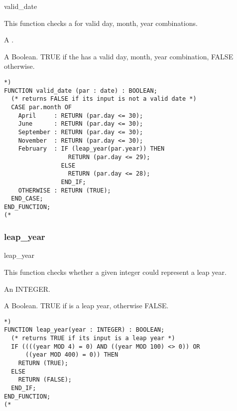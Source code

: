 \documentclass{article}
\begin{document}
\begin{Mnamedesc}{valid_date}
\begin{Mdesctext}
This function checks a  for valid day, month, year combinations.
\end{Mdesctext}

\begin{Ipars}

\item[par:] A .

\item[RESULT:] A Boolean. TRUE if the  has a valid day, month, year
combination, FALSE otherwise.
\end{Ipars}

\begin{Mexp}
\begin{verbatim}
*)
FUNCTION valid_date (par : date) : BOOLEAN;
  (* returns FALSE if its input is not a valid date *)
  CASE par.month OF
    April     : RETURN (par.day <= 30);
    June      : RETURN (par.day <= 30);
    September : RETURN (par.day <= 30);
    November  : RETURN (par.day <= 30);
    February  : IF (leap_year(par.year)) THEN
                  RETURN (par.day <= 29);
                ELSE
                  RETURN (par.day <= 28);
                END_IF;
    OTHERWISE : RETURN (TRUE);
  END_CASE;
END_FUNCTION;
(*
\end{verbatim}
\end{Mexp}
\end{Mnamedesc}

\subsubsection{leap\_year}

\begin{Mnamedesc}{leap_year}
\begin{Mdesctext}
    This function checks whether a given integer could represent a leap year.
\end{Mdesctext}

\begin{Ipars}

\item[year:] An INTEGER.

\item[RESULT:] A Boolean. TRUE if  is a leap year, otherwise FALSE.
\end{Ipars}

\begin{Mexp}
\begin{verbatim}
*)
FUNCTION leap_year(year : INTEGER) : BOOLEAN;
  (* returns TRUE if its input is a leap year *)
  IF ((((year MOD 4) = 0) AND ((year MOD 100) <> 0)) OR
      ((year MOD 400) = 0)) THEN
    RETURN (TRUE);
  ELSE
    RETURN (FALSE);
  END_IF;
END_FUNCTION;
(*
\end{verbatim}
\end{Mexp}
\end{Mnamedesc}
\end{document}
